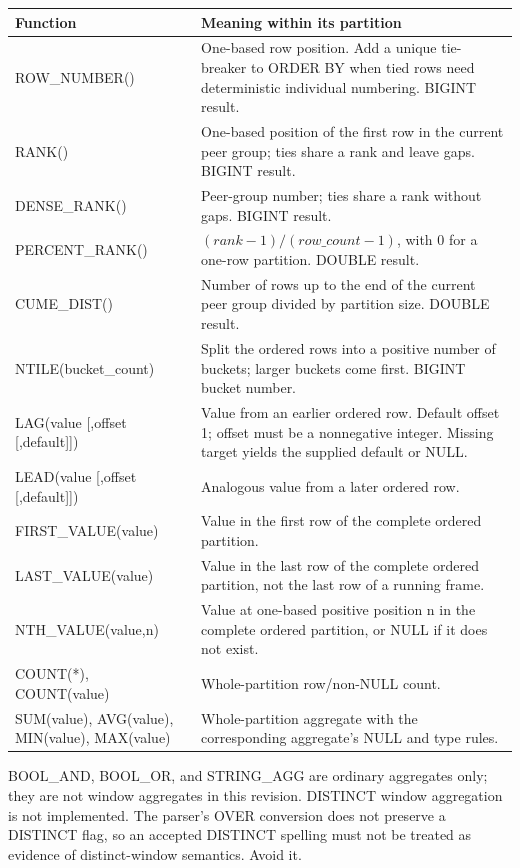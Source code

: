 \begin{longtable}{p{.30\linewidth}p{.63\linewidth}}
\toprule
Function & Meaning within its partition \\
\midrule
\endhead
ROW\_NUMBER() & One-based row position. Add a unique tie-breaker to ORDER BY when tied rows need deterministic individual numbering. BIGINT result. \\
RANK() & One-based position of the first row in the current peer group; ties share a rank and leave gaps. BIGINT result. \\
DENSE\_RANK() & Peer-group number; ties share a rank without gaps. BIGINT result. \\
PERCENT\_RANK() & \((rank-1)/(row\_count-1)\), with 0 for a one-row partition. DOUBLE result. \\
CUME\_DIST() & Number of rows up to the end of the current peer group divided by partition size. DOUBLE result. \\
NTILE(bucket\_count) & Split the ordered rows into a positive number of buckets; larger buckets come first. BIGINT bucket number. \\
LAG(value [,offset [,default]]) & Value from an earlier ordered row. Default offset 1; offset must be a nonnegative integer. Missing target yields the supplied default or NULL. \\
LEAD(value [,offset [,default]]) & Analogous value from a later ordered row. \\
FIRST\_VALUE(value) & Value in the first row of the complete ordered partition. \\
LAST\_VALUE(value) & Value in the last row of the complete ordered partition, not the last row of a running frame. \\
NTH\_VALUE(value,n) & Value at one-based positive position n in the complete ordered partition, or NULL if it does not exist. \\
COUNT(*), COUNT(value) & Whole-partition row/non-NULL count. \\
SUM(value), AVG(value), MIN(value), MAX(value) & Whole-partition aggregate with the corresponding aggregate's NULL and type rules. \\
\bottomrule
\end{longtable}

BOOL\_AND, BOOL\_OR, and STRING\_AGG are ordinary aggregates only; they are not window aggregates in this revision. DISTINCT window aggregation is not implemented. The parser's OVER conversion does not preserve a DISTINCT flag, so an accepted DISTINCT spelling must not be treated as evidence of distinct-window semantics. Avoid it.

